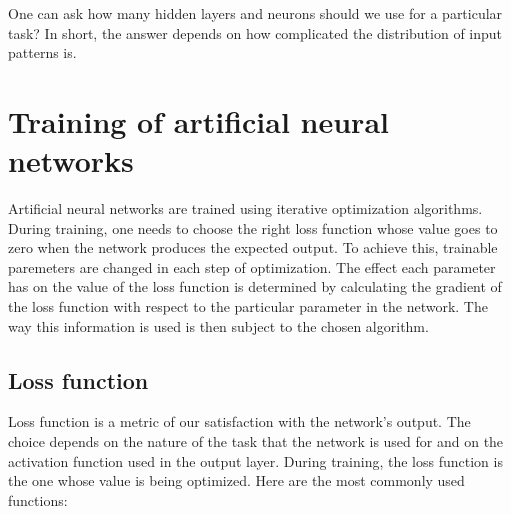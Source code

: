One can ask how many hidden layers and neurons should we use for a particular task? In short, the answer depends on how complicated the distribution of input patterns is.








\section{Training of artificial neural networks}

Artificial neural networks are trained using iterative optimization algorithms. During training, one needs to choose the right loss function whose value goes to zero when the network produces the expected output. To achieve this, trainable paremeters are changed in each step of optimization. The effect each parameter has on the value of the loss function is determined by calculating the gradient of the loss function with respect to the particular parameter in the network. The way this information is used is then subject to the chosen algorithm. 

\subsection{Loss function}

Loss function is a metric of our satisfaction with the network's output. The choice depends on the nature of the task that the network is used for and on the activation function used in the output layer. During training, the loss function is the one whose value is being optimized. Here are the most commonly used functions:

